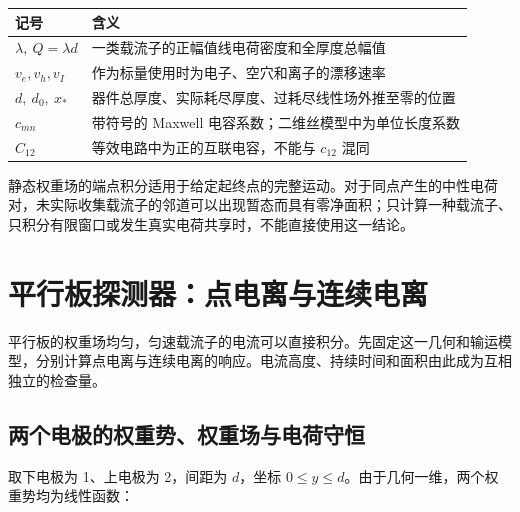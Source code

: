 \documentclass[
  11pt,
  a4paper,
  oneside,
  openany]{report}
\numberwithin{equation}{chapter}
\begin{document}
\begin{longtable}[]{@{}
  >{\raggedright\arraybackslash}p{}
  >{\raggedright\arraybackslash}p{}@{}}
\toprule\noalign{}
\begin{minipage}[b]{\linewidth}\raggedright
记号
\end{minipage} & \begin{minipage}[b]{\linewidth}\raggedright
含义
\end{minipage} \\
\midrule\noalign{}
\endhead
\bottomrule\noalign{}
\endlastfoot
\(\lambda,\ Q=\lambda d\) &
一类载流子的正幅值线电荷密度和全厚度总幅值 \\
\(v_e,v_h,v_I\) & 作为标量使用时为电子、空穴和离子的漂移速率 \\
\(d,\ d_0,\ x_\ast\) &
器件总厚度、实际耗尽厚度、过耗尽线性场外推至零的位置 \\
\(c_{mn}\) & 带符号的 Maxwell 电容系数；二维丝模型中为单位长度系数 \\
\(C_{12}\) & 等效电路中为正的互联电容，不能与 \(c_{12}\) 混同 \\
\end{longtable}

静态权重场的端点积分适用于给定起终点的完整运动。对于同点产生的中性电荷对，未实际收集载流子的邻道可以出现暂态而具有零净面积；只计算一种载流子、只积分有限窗口或发生真实电荷共享时，不能直接使用这一结论。

\clearpage
\tableofcontents
\clearpage
{}

\chapter{平行板探测器：点电离与连续电离}\label{ux5e73ux884cux677fux63a2ux6d4bux5668ux70b9ux7535ux79bbux4e0eux8fdeux7eedux7535ux79bb}

平行板的权重场均匀，匀速载流子的电流可以直接积分。先固定这一几何和输运模型，分别计算点电离与连续电离的响应。电流高度、持续时间和面积由此成为互相独立的检查量。

\section{两个电极的权重势、权重场与电荷守恒}\label{ux4e24ux4e2aux7535ux6781ux7684ux6743ux91cdux52bfux6743ux91cdux573aux4e0eux7535ux8377ux5b88ux6052}

取下电极为 1、上电极为 2，间距为 \(d\)，坐标
\(0\le y\le d\)。由于几何一维，两个权重势均为线性函数：
\end{document}
